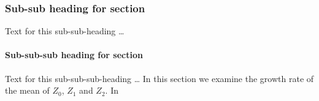 \documentclass[twocolumn]{bmcart}%
\begin{document}
\subsubsection*{Sub-sub heading for section}
Text for this sub-sub-heading \ldots
\paragraph*{Sub-sub-sub heading for section}
Text for this sub-sub-sub-heading \ldots
In this section we examine the growth rate of the mean of $Z_0$, $Z_1$ and $Z_2$. In


\end{document}
